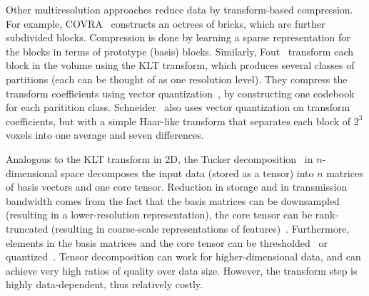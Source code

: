Other multiresolution approaches reduce data by transform-based compression. For example,
COVRA~\cite{covra2012} constructs an octrees of bricks, which are further subdivided blocks.
Compression is done by learning a sparse representation for the blocks in terms of prototype (basis)
blocks. Similarly, Fout\etal~\cite{hw_dvr2007} transform each block in the volume using the KLT
transform, which produces several classes of partitions (each can be thought of as one resolution
level). They compress the transform coefficients using vector quantization~\cite{vq1992}, by
constructing one codebook for each paritition class. Schneider\etal~\cite{compression_domain2003}
also uses vector quantization on transform coefficients, but with a simple Haar-like transform that
separates each block of $2^3$ voxels into one average and seven differences.

Analogous to the KLT transform in 2D, the Tucker decomposition~\cite{tensor_dvr2015} in
$n$-dimensional space decomposes the input data (stored as a tensor) into $n$ matrices of basis
vectors and one core tensor. Reduction in storage and in transmission bandwidth comes from the fact
that the basis matrices can be downsampled (resulting in a lower-resolution representation), the
core tensor can be rank-truncated (resulting in coarse-scale representations of
features)~\cite{tamresh,tucker-thresholding,multiscale-tensor}. Furthermore, elements in the basis
matrices and the core tensor can be thresholded~\cite{tucker-thresholding} or
quantized~\cite{tamresh,multiscale-tensor}. Tensor decomposition can work for higher-dimensional
data, and can achieve very high ratios of quality over data size. However, the transform step is
highly data-dependent, thus relatively costly.

